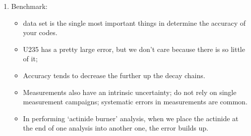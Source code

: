 \documentclass{school-22.211-notes}
\begin{document}
\begin{enumerate}
\item Benchmark: 
  \begin{itemize}
  \item data set is the single most important things in determine the accuracy of your codes.
  \item U235 has a pretty large error, but we don't care because there is so little of it;
  \item Accuracy tends to decrease the further up the decay chains. 
  \item Measurements also have an intrinsic uncertainty; do not rely on single measurement campaigns; systematic errors in measurements are common. 
  \item In performing `actinide burner' analysis, when we place the actinide at the end of one analysis into another one, the error builds up. 
  \end{itemize}
\end{enumerate} 
\end{document}
